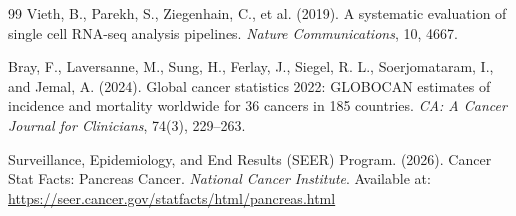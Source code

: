 \documentclass[11pt,a4paper]{article}
\begin{document}
\begin{thebibliography}{99}
Vieth, B., Parekh, S., Ziegenhain, C., et al. (2019). A systematic evaluation of single cell RNA-seq analysis pipelines. \textit{Nature Communications}, 10, 4667.

Bray, F., Laversanne, M., Sung, H., Ferlay, J., Siegel, R. L., Soerjomataram, I., and Jemal, A. (2024). Global cancer statistics 2022: GLOBOCAN estimates of incidence and mortality worldwide for 36 cancers in 185 countries. \textit{CA: A Cancer Journal for Clinicians}, 74(3), 229--263.

Surveillance, Epidemiology, and End Results (SEER) Program. (2026). Cancer Stat Facts: Pancreas Cancer. \textit{National Cancer Institute}. Available at: \url{https://seer.cancer.gov/statfacts/html/pancreas.html}

\end{thebibliography}

\clearpage
{}
\end{document}
